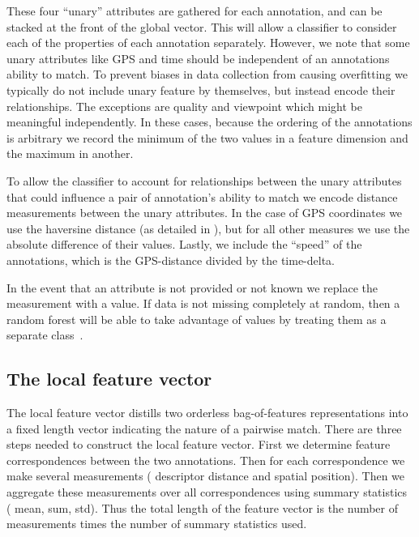 These four ``unary'' attributes are gathered for each annotation, and can be
  stacked at the front of the global vector.
This will allow a classifier to consider each of the properties of each
  annotation separately.
However, we note that some unary attributes like GPS and time should be
  independent of an annotations ability to match.
To prevent biases in data collection from causing overfitting we typically do
  not include unary feature by themselves, but instead encode their
  relationships.
The exceptions are quality and viewpoint which might be meaningful
  independently.
In these cases, because the ordering of the annotations is arbitrary we record
  the minimum of the two values in a feature dimension and the maximum in
  another.

To allow the classifier to account for relationships between the unary
  attributes that could influence a pair of annotation's ability to match we
  encode distance measurements between the unary attributes.
In the case of GPS coordinates we use the haversine distance (as detailed in
  ), but for all other measures we use the absolute
  difference of their values.
Lastly, we include the ``speed'' of the annotations, which is the GPS-distance
  divided by the time-delta.

In the event that an attribute is not provided or not known we replace the
  measurement with a \nan{} value.
If data is not missing completely at random, then a random forest will be able
  to take advantage of \nan{} values by treating them as a separate
  class~\cite{ding_investigation_2010}.


\subsection{The local feature vector}
The local feature vector distills two orderless bag-of-features
  representations into a fixed length vector indicating the nature of a pairwise
  match.
There are three steps needed to construct the local feature vector.
First we determine feature correspondences between the two annotations.
Then for each correspondence we make several measurements (\eg{} descriptor
  distance and spatial position).
Then we aggregate these measurements over all correspondences using summary
  statistics (\eg{} mean, sum, std).
Thus the total length of the feature vector is the number of measurements
  times the number of summary statistics used.

